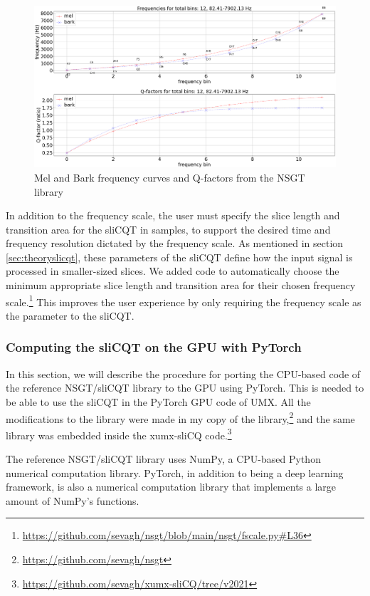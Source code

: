 \documentclass[report.tex]{subfiles}
\begin{document}
\begin{figure}[ht]
	\centering
	\includegraphics[width=\textwidth]{./images-freqscales/melbarkpitchesqs.png}
	\caption{Mel and Bark frequency curves and Q-factors from the NSGT library}
	\label{fig:melbarkfsandqs}
\end{figure}

In addition to the frequency scale, the user must specify the slice length and transition area for the sliCQT in samples, to support the desired time and frequency resolution dictated by the frequency scale. As mentioned in section \ref{sec:theoryslicqt}, these parameters of the sliCQT define how the input signal is processed in smaller-sized slices. We added code to automatically choose the minimum appropriate slice length and transition area for their chosen frequency scale.\footnote{\url{https://github.com/sevagh/nsgt/blob/main/nsgt/fscale.py\#L36}} This improves the user experience by only requiring the frequency scale as the parameter to the sliCQT.

\subsubsection{Computing the sliCQT on the GPU with PyTorch}
\label{sec:torchslicq}

In this section, we will describe the procedure for porting the CPU-based code of the reference NSGT/sliCQT library to the GPU using PyTorch. This is needed to be able to use the sliCQT in the PyTorch GPU code of UMX. All the modifications to the library were made in my copy of the library,\footnote{\url{https://github.com/sevagh/nsgt}} and the same library was embedded inside the xumx-sliCQ code.\footnote{\url{https://github.com/sevagh/xumx-sliCQ/tree/v2021}}

The reference NSGT/sliCQT library uses NumPy, a CPU-based Python numerical computation library. PyTorch, in addition to being a deep learning framework, is also a numerical computation library that implements a large amount of NumPy's functions.
\end{document}
